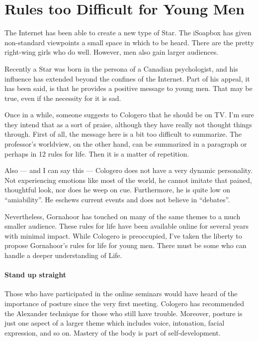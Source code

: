 \section{Rules too Difficult for Young Men}

The Internet has been able to create a new type of Star. The iSoapbox has given non-standard viewpoints a small space in which to be heard. There are the pretty right-wing girls who do well. However, men also gain larger audiences.

Recently a Star was born in the persona of a Canadian psychologist, and his influence has extended beyond the confines of the Internet. Part of his appeal, it has been said, is that he provides a positive message to young men. That may be true, even if the necessity for it is sad.

Once in a while, someone suggests to Cologero that he should be on TV. I'm sure they intend that as a sort of praise, although they have really not thought things through. First of all, the message here is a bit too difficult to summarize. The professor's worldview, on the other hand, can be summarized in a paragraph or perhaps in 12 rules for life. Then it is a matter of repetition.

Also — and I can say this — Cologero does not have a very dynamic personality. Not experiencing emotions like most of the world, he cannot imitate that pained, thoughtful look, nor does he weep on cue. Furthermore, he is quite low on “amiability”. He eschews current events and does not believe in “debates”.

Nevertheless, Gornahoor has touched on many of the same themes to a much smaller audience. These rules for life have been available online for several years with minimal impact. While Cologero is preoccupied, I've taken the liberty to propose Gornahoor's rules for life for young men. There must be some who can handle a deeper understanding of Life.

\paragraph{Stand up straight}
Those who have participated in the online seminars would have heard of the importance of posture since the very first meeting. Cologero has recommended the Alexander technique for those who still have trouble. Moreover, posture is just one aspect of a larger theme which includes voice, intonation, facial expression, and so on. Mastery of the body is part of self-development.

